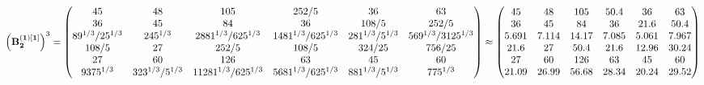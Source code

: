 \documentclass[10pt,a4paper]{article}
\begin{document}
	\[
		\left(\bold{B_2^{(1)[1]}}\right)^{3} = 
		\begin{pmatrix}
			{{45}}{} & {{48}}{} & {{105}}{} & {{252}} / {{5}} & {{36}}{} & {{63}}{} \\
			{{36}}{} & {{45}}{} & {{84}}{} & {{36}}{} & {{108}} / {{5}} & {{252}} / {{5}} \\
			{{8}{9^ {1 / 3}}} / {{25^ {1 / 3}}} & {{2}{45^ {1 / 3}}}{} & {{28}{81^ {1 / 3}}} / {{625^ {1 / 3}}} & {{14}{81^ {1 / 3}}} / {{625^ {1 / 3}}} & {{2}{81^ {1 / 3}}} / {{5^ {1 / 3}}} & {{56}{9^ {1 / 3}}} / {{3125^ {1 / 3}}} \\
			{{108}} / {{5}} & {{27}}{} & {{252}} / {{5}} & {{108}} / {{5}} & {{324}} / {{25}} & {{756}} / {{25}} \\
			{{27}}{} & {{60}}{} & {{126}}{} & {{63}}{} & {{45}}{} & {{60}}{} \\
			{{9375^ {1 / 3}}}{} & {{32}{3^ {1 / 3}}} / {{5^ {1 / 3}}} & {{112}{81^ {1 / 3}}} / {{625^ {1 / 3}}} & {{56}{81^ {1 / 3}}} / {{625^ {1 / 3}}} & {{8}{81^ {1 / 3}}} / {{5^ {1 / 3}}} & {{7}{75^ {1 / 3}}}{} \\
		\end{pmatrix}
		\approx
		\begin{pmatrix}
			45       & 48       & 105      & 50.4     & 36       & 63       \\
			36       & 45       & 84       & 36       & 21.6     & 50.4     \\
			5.691    & 7.114    & 14.17    & 7.085    & 5.061    & 7.967    \\
			21.6     & 27       & 50.4     & 21.6     & 12.96    & 30.24    \\
			27       & 60       & 126      & 63       & 45       & 60       \\
			21.09    & 26.99    & 56.68    & 28.34    & 20.24    & 29.52    \\
		\end{pmatrix}
	\]
\end{document}
